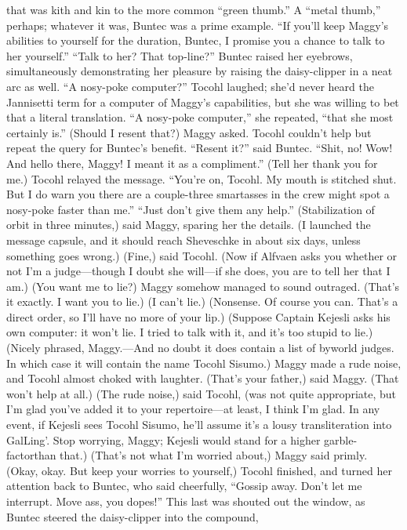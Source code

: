\documentclass[9pt]{article}
\begin{document}
that was kith and kin to the more common “green thumb.” A “metal thumb,” perhaps; whatever it was,
Buntec was a prime example. “If you’ll keep Maggy’s abilities to yourself for the duration, Buntec, I
promise you a chance to talk to her yourself.”
“Talk to her? That top-line?” Buntec raised her eyebrows, simultaneously demonstrating her pleasure
by raising the daisy-clipper in a neat arc as well. “A nosy-poke computer?”
Tocohl laughed; she’d never heard the Jannisetti term for a computer of Maggy’s capabilities, but she
was willing to bet that a literal translation. “A nosy-poke computer,” she repeated, “that she most
certainly is.”
(Should I resent that?) Maggy asked. Tocohl couldn’t help but repeat the query for Buntec’s benefit.
“Resent it?” said Buntec. “Shit, no! Wow! And hello there, Maggy! I meant it as a compliment.”
(Tell her thank you for me.)
Tocohl relayed the message.
“You’re on, Tocohl. My mouth is stitched shut. But I do warn you there are a couple-three
smartasses in the crew might spot a nosy-poke faster than me.”
“Just don’t give them any help.”
(Stabilization of orbit in three minutes,) said Maggy, sparing her the details. (I launched the message
capsule, and it should reach Sheveschke in about six days, unless something goes wrong.)
(Fine,) said Tocohl. (Now if Alfvaen asks you whether or not I’m a judge—though I doubt she
will—if she does, you are to tell her that I am.)
(You want me to lie?) Maggy somehow managed to sound outraged.
(That’s it exactly. I want you to lie.)
(I can’t lie.)
(Nonsense. Of course you can. That’s a direct order, so I’ll have no more of your lip.)
(Suppose Captain Kejesli asks his own computer: it won’t lie. I tried to talk with it, and it’s too
stupid to lie.)
(Nicely phrased, Maggy.—And no doubt it does contain a list of byworld judges. In which case it
will contain the name Tocohl Sisumo.)
Maggy made a rude noise, and Tocohl almost choked with laughter. (That’s your father,) said
Maggy. (That won’t help at all.)
(The rude noise,) said Tocohl, (was not quite appropriate, but I’m glad you’ve added it to your
repertoire—at least, I think I’m glad. In any event, if Kejesli sees Tocohl Sisumo, he’ll assume it’s a
lousy transliteration into GalLing’. Stop worrying, Maggy; Kejesli would stand for a higher garble-factorthan that.)
(That’s not what I’m worried about,) Maggy said primly.
(Okay, okay. But keep your worries to yourself,) Tocohl finished, and turned her attention back to
Buntec, who said cheerfully, “Gossip away. Don’t let me interrupt. Move ass, you dopes!”
This last was shouted out the window, as Buntec steered the daisy-clipper into the compound,
\end{document}
